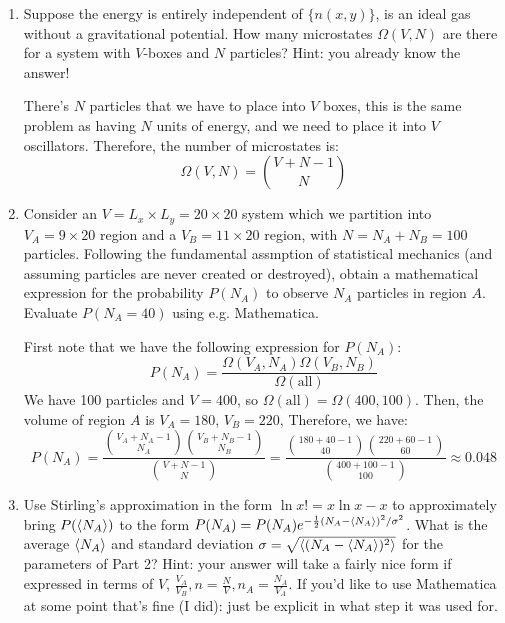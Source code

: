 \documentclass[10pt]{article}
\begin{document}
	\begin{enumerate}[label=\alph*), resume]
		\item Suppose the energy is entirely independent of $\{n(x, y)\}$, is an ideal gas without a 
			gravitational potential. How many microstates $\Omega(V, N)$ are there for a system with $V$-boxes
			and $N$ particles? Hint: you already know the answer!

			\begin{solution}
				There's $N$ particles that we have to place into $V$ boxes, this is the same problem 
				as having $N$ units of energy, and we need to place it into $V$ oscillators. Therefore, 
				the number of microstates is: 
				\[
					\Omega(V, N) = {V + N - 1 \choose N} 
				\] 
			\end{solution}
		\item Consider an $V = L_x \times L_y = 20 \times 20$ system which we partition into $V_A = 9 \times 
			20$ region and a $V_B = 11 \times 20$ region, with $N = N_A + N_B = 100$ particles. Following the 
			fundamental assmption of statistical mechanics (and assuming particles are never created or 
			destroyed), obtain a mathematical expression for the probability $P(N_A)$ to 
			observe $N_A$ particles in region $A$. Evaluate $P(N_A = 40)$ using e.g. Mathematica.

			\begin{solution}
				First note that we have the following expression for $P(N_A)$:
				\[
					P(N_A) = \frac{\Omega(V_A, N_A) \Omega(V_B, N_B)}{\Omega(\text{all})}
				\]
				We have 100 particles and $V = 400$, so $\Omega(\text{all}) = \Omega(400, 100)$. Then, 
				the volume of region $A$ is $V_A = 180$, $V_B = 220$, Therefore, we have:
				\[
					P(N_A) = \frac{{V_A + N_A - 1 \choose N_A} {V_B + N_B - 1 \choose N_B}}{{V + N - 1 \choose 
					N}} = \frac{{180 + 40 - 1 \choose 40}{220 + 60 - 1 \choose 60}}{{400 + 100 - 1 \choose 
					100}} \approx 0.048
				\] 
			\end{solution}
		\item Use Stirling's approximation in the form $\ln x! = x \ln x - x$ to approximately 
			bring $P(\langle N_A \rangle)$ to the form $P(N_A) = P(N_A)e^{-\frac{1}{2}(N_A - \langle N_A \rangle)^2 / \sigma^2}$.
			What is the average $\langle N_A \rangle$ and standard deviation $\sigma = \sqrt{\langle (N_A - \langle N_A \rangle)^2 \rangle}$
			for the parameters of Part 2? Hint: your answer will take a fairly nice form if expressed in 
			terms of $V$, $\frac{V_A}{V_B}, n = \frac{N}{V}, n_A = \frac{N_A}{V_A}$. If you'd like to use 
			Mathematica at some point that's fine (I did): just be explicit in what step it was used for. 


\end{enumerate}
\end{document}
